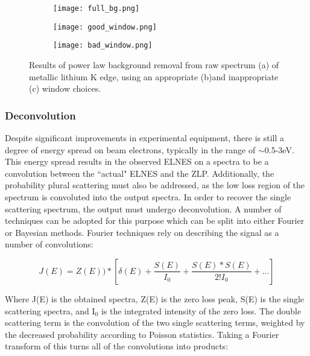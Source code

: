 \begin{figure}
	\centering
	\begin{subfigure}{0.45\textwidth}
		\texttt{[image: full\_bg.png]} 
		\caption{}
		\label{full_bg}
	\end{subfigure}
	\hspace{-0.01cm}
	
	\begin{subfigure}{0.45\textwidth}
		\texttt{[image: good\_window.png]} 
		\caption{}
		\label{good_window}
	\end{subfigure}
	\begin{subfigure}{0.45\textwidth}
		\texttt{[image: bad\_window.png]} 
		\caption{}
		\label{bad_window}
	\end{subfigure}
	\caption{Results of power law background removal from raw spectrum (a) of metallic lithium K edge, using an appropriate (b)and inappropriate (c) window choices.}
	\label{bg_removal}
\end{figure}

\subsubsection{Deconvolution} \label{deconvolution}
Despite significant improvements in experimental equipment, there is still a degree of energy spread on beam electrons, typically in the range of $\sim$0.5-3eV.  This energy spread results in the observed ELNES on a spectra to be a convolution between the ``actual" ELNES and the ZLP.  Additionally, the probability plural scattering must also be addressed, as the low loss region of the spectrum is convoluted into the output spectra.  In order to recover the single scattering spectrum, the output must undergo deconvolution.  A number of techniques can be adopted for this purpose which can be split into either Fourier or Bayesian methods.   Fourier techniques rely on describing the signal as a number of convolutions:

\begin{equation}
 	J(E) = Z(E))\ast[\delta(E) + \frac{S(E)}{I_0} +  \frac{S(E) \ast S(E)}{2! I_0}   + ...]
\end{equation}



Where J(E) is the obtained spectra, Z(E) is the zero loss peak, S(E) is the single scattering spectra, and I$_0$ is the integrated intensity of the zero loss.  The double scattering term is the convolution of the two single scattering terms, weighted by the decreased probability according to Poisson statistics.   Taking a Fourier transform of this turns all of the convolutions into products: 

